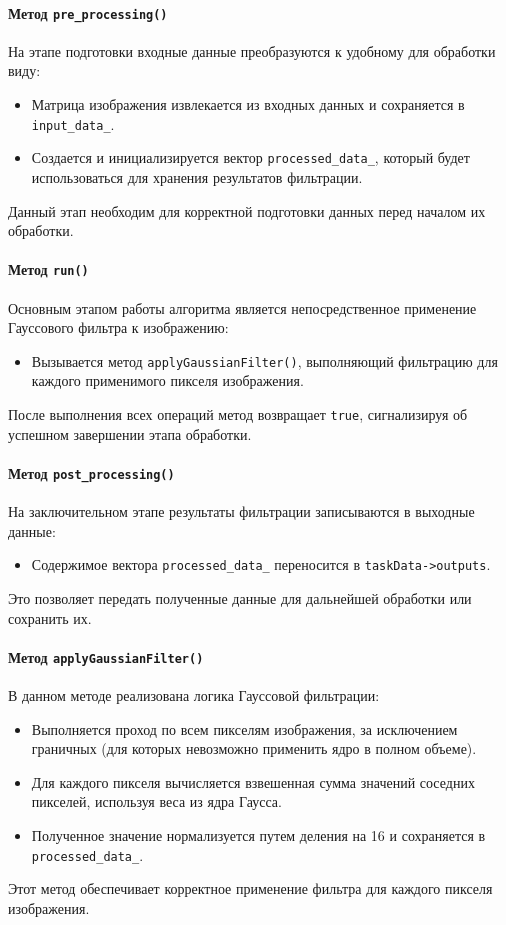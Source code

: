 \documentclass[12pt]{article}
\begin{document}
\paragraph{Метод \texttt{pre\_processing()}}
На этапе подготовки входные данные преобразуются к удобному для обработки виду:
\begin{itemize}
    \item Матрица изображения извлекается из входных данных и сохраняется в \texttt{input\_data\_}.
    \item Создается и инициализируется вектор \texttt{processed\_data\_}, который будет использоваться для хранения результатов фильтрации.
\end{itemize}
Данный этап необходим для корректной подготовки данных перед началом их обработки.

\paragraph{Метод \texttt{run()}}
Основным этапом работы алгоритма является непосредственное применение Гауссового фильтра к изображению:
\begin{itemize}
    \item Вызывается метод \texttt{applyGaussianFilter()}, выполняющий фильтрацию для каждого применимого пикселя изображения.
\end{itemize}
После выполнения всех операций метод возвращает \texttt{true}, сигнализируя об успешном завершении этапа обработки.

\paragraph{Метод \texttt{post\_processing()}}
На заключительном этапе результаты фильтрации записываются в выходные данные:
\begin{itemize}
    \item Содержимое вектора \texttt{processed\_data\_} переносится в \texttt{taskData->outputs}.
\end{itemize}
Это позволяет передать полученные данные для дальнейшей обработки или сохранить их.

\paragraph{Метод \texttt{applyGaussianFilter()}}
В данном методе реализована логика Гауссовой фильтрации:
\begin{itemize}
    \item Выполняется проход по всем пикселям изображения, за исключением граничных (для которых невозможно применить ядро в полном объеме).
    \item Для каждого пикселя вычисляется взвешенная сумма значений соседних пикселей, используя веса из ядра Гаусса.
    \item Полученное значение нормализуется путем деления на 16 и сохраняется в \texttt{processed\_data\_}.
\end{itemize}
Этот метод обеспечивает корректное применение фильтра для каждого пикселя изображения.
\end{document}
